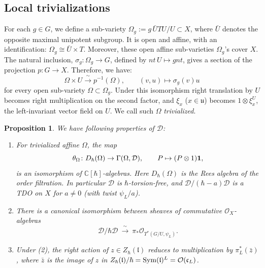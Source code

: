 \documentclass{article}
\theoremstyle{plain}
\newtheorem{proposition}[theorem]{Proposition}
\theoremstyle{definition}
\theoremstyle{remark}
\numberwithin{equation}{section}
\begin{document}
\subsection{Local trivializations}
For each $g\in G$, we define a sub-variety $\Omega_g:=g\,\bar{U}TU/U\subset X$, where $\bar{U}$ denotes the opposite maximal unipotent subgroup. It is open and affine, with an identification: $\Omega_g\cong \bar{U}\times T$. Moreover, these open affine sub-varieties $\Omega_g$'s cover $X$.
The natural inclusion, $\sigma_g\colon\Omega_g\to G$, defined by $nt\,U\mapsto gnt$, gives a section of the projection $p: G \to X$. Therefore, we have:
\[
\Omega\times U\xrightarrow{\ \sim\ }p^{-1}(\Omega),\qquad (v,u)\mapsto\sigma_g(v)u
\]
for every open sub-variety $\Omega\subset\Omega_g$. Under this isomorphism right translation by $U$ becomes right multiplication on the
second factor, and $\xi_x$ ($x\in\mathfrak u$) becomes $1\otimes\xi^U_x$, the left-invariant vector field on $U$. We call such $\Omega$ \emph{trivialized}.

\begin{proposition}\label{prop:D-structure} We have following properties of $\mathcal D$:
\leavevmode
\begin{enumerate}
\item For trivialized affine $\Omega$, the map
\[
\theta_\Omega\colon D_\hbar(\Omega)\to\Gamma(\Omega,\mathcal D),\qquad P\mapsto(P\otimes1)\mathbf 1,
\]
is an isomorphism of $\mathbb C[\hbar]$-algebras. Here $D_\hbar(\Omega)$ is the Rees algebra of the order filtration. In particular $\mathcal D$ is $\hbar$-torsion-free, and
$\mathcal D/(\hbar-a)\mathcal D$ is a TDO on $X$ for $a\neq0$ (with twist $\psi_L/a$).
\item There is a canonical isomorphism between sheaves of commutative $\mathcal O_X$-algebras
\[
\mathcal D/\hbar\mathcal D\ \xrightarrow{\ \sim\ }\ \pi_*\mathcal O_{T^*(G/U,\psi_L)} .
\]
\item Under (2), the right action of $z\in Z_\hbar(\mathfrak l)$ reduces to multiplication by $\pi_L^*(\bar z)$, where
$\bar z$ is the image of $z$ in $Z_\hbar(\mathfrak l)/\hbar=\operatorname{Sym}(\mathfrak l)^L=\mathcal O(\mathfrak c_L)$.
\end{enumerate}
\end{proposition}
\end{document}
